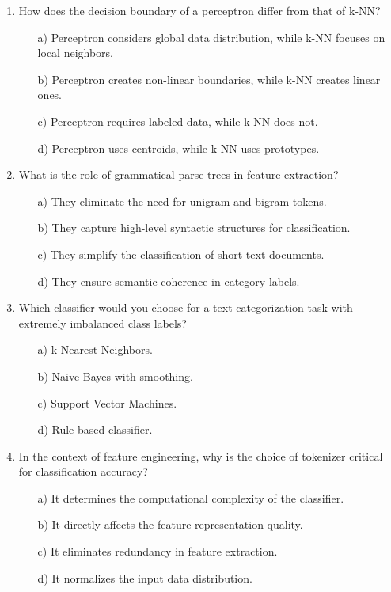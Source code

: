 \documentclass[8pt]{extarticle}
\begin{document}
\begin{multicols}{2}
\begin{enumerate}
\item How does the decision boundary of a perceptron differ from that of k-NN?
\begin{itemize}
\item[a)] Perceptron considers global data distribution, while k-NN focuses on local neighbors.
\item[b)] Perceptron creates non-linear boundaries, while k-NN creates linear ones.
\item[c)] Perceptron requires labeled data, while k-NN does not.
\item[d)] Perceptron uses centroids, while k-NN uses prototypes.
\end{itemize}


\item What is the role of grammatical parse trees in feature extraction?
\begin{itemize}
\item[a)] They eliminate the need for unigram and bigram tokens.
\item[b)] They capture high-level syntactic structures for classification.
\item[c)] They simplify the classification of short text documents.
\item[d)] They ensure semantic coherence in category labels.
\end{itemize}


\item Which classifier would you choose for a text categorization task with extremely imbalanced class labels?
\begin{itemize}
\item[a)] k-Nearest Neighbors.
\item[b)] Naive Bayes with smoothing.
\item[c)] Support Vector Machines.
\item[d)] Rule-based classifier.
\end{itemize}


\item In the context of feature engineering, why is the choice of tokenizer critical for classification accuracy?
\begin{itemize}
\item[a)] It determines the computational complexity of the classifier.
\item[b)] It directly affects the feature representation quality.
\item[c)] It eliminates redundancy in feature extraction.
\item[d)] It normalizes the input data distribution.
\end{itemize}



\end{enumerate}
\end{multicols}
\end{document}
